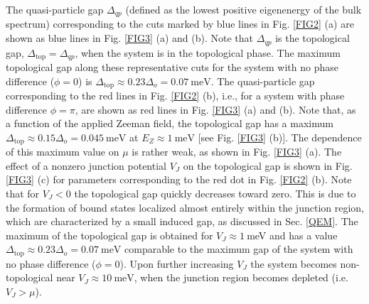 \documentclass[twocolumn,aps,prb,nofootinbib]{revtex4-2}
\begin{document}
The quasi-particle gap  $\Delta_{qp}$ (defined as the lowest positive eigenenergy of the bulk spectrum) corresponding to the cuts marked by blue lines in Fig. \ref{FIG2} (a) are shown as blue lines in Fig. \ref{FIG3} (a) and (b). Note that $\Delta_{qp}$ is the topological gap, $\Delta_{\text{top}} = \Delta_{qp}$, when the system is in the topological phase. The maximum topological gap along these representative cuts for the system with no phase difference ($\phi = 0$) is $\Delta_{\text{top}} \approx 0.23 \Delta_o = 0.07~\text{meV}$.
The quasi-particle gap corresponding to the red lines in Fig. \ref{FIG2} (b), i.e., for a system with phase difference $\phi=\pi$, are shown as red lines in Fig. \ref{FIG3} (a) and (b). 
Note that, as a function of the applied Zeeman field, the topological gap has a maximum $\Delta_{\text{top}} \approx 0.15 \Delta_o = 0.045~\text{meV}$ at $E_Z \approx 1~\text{meV}$ [see Fig. \ref{FIG3} (b)]. The dependence of this maximum value on $\mu$ is rather weak, as shown  in Fig. \ref{FIG3} (a).  
The effect of a nonzero junction potential $V_J$ on the topological gap is shown in 
Fig. \ref{FIG3} (c) for parameters corresponding to the red dot in Fig. \ref{FIG2} (b). Note that for $V_J < 0$ the topological gap quickly decreases toward zero. This is due to the formation of bound states localized almost entirely within the junction region, which are characterized by a small induced gap, as discussed in Sec. \ref{QEM}. The maximum of the topological gap is obtained for $V_J \approx 1~$meV and has a value $\Delta_{\text{top}} \approx 0.23 \Delta_o= 0.07~\text{meV}$ comparable to the maximum gap of the system with no phase difference ($\phi=0$). Upon further increasing $V_J$  the system becomes non-topological near $V_J \approx 10~\text{meV}$, when the junction region becomes depleted (i.e. $V_J > \mu$).
\end{document}
